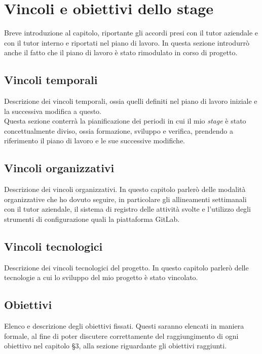 
\section{Vincoli e obiettivi dello stage}

Breve introduzione al capitolo, riportante gli accordi presi con il tutor aziendale e con il tutor interno e riportati nel piano di lavoro. In questa sezione introdurrò anche il fatto che il piano di lavoro è stato rimodulato in corso di progetto.

\subsection{Vincoli temporali}

Descrizione dei vincoli temporali, ossia quelli definiti nel piano di lavoro iniziale e la successiva modifica a questo. \\
Questa sezione conterrà la pianificazione dei periodi in cui il mio \textit{stage} è stato concettualmente diviso, ossia formazione, sviluppo e verifica, prendendo a riferimento il piano di lavoro e le sue successive modifiche.

\subsection{Vincoli organizzativi}

Descrizione dei vincoli organizzativi. In questo capitolo parlerò delle modalità organizzative che ho dovuto seguire, in particolare gli allineamenti settimanali con il tutor aziendale, il sistema di registro delle attività svolte e l'utilizzo degli strumenti di configurazione quali la piattaforma GitLab.

\subsection{Vincoli tecnologici}

Descrizione dei vincoli tecnologici del progetto. In questo capitolo parlerò delle tecnologie a cui lo sviluppo del mio progetto è stato vincolato.

\subsection{Obiettivi}

Elenco e descrizione degli obiettivi fissati. Questi saranno elencati in maniera formale, al fine di poter discutere correttamente del raggiungimento di ogni obiettivo nel capitolo \S 3, alla sezione riguardante gli obiettivi raggiunti.

